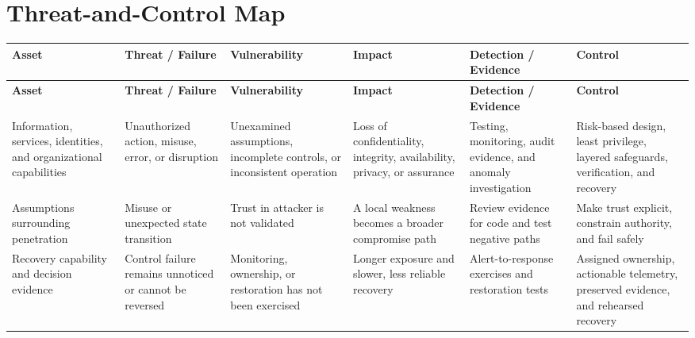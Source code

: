 \documentclass[11pt,letterpaper]{article}
\begin{document}
\section*{Threat-and-Control Map}
\begingroup\scriptsize\setlength{\tabcolsep}{2pt}
\begin{longtable}{>{\raggedright\arraybackslash}p{}>{\raggedright\arraybackslash}p{}>{\raggedright\arraybackslash}p{}>{\raggedright\arraybackslash}p{}>{\raggedright\arraybackslash}p{}>{\raggedright\arraybackslash}p{}}
\toprule\rowcolor{Navy}\color{white}\textbf{Asset} & \color{white}\textbf{Threat / Failure} & \color{white}\textbf{Vulnerability} & \color{white}\textbf{Impact} & \color{white}\textbf{Detection / Evidence} & \color{white}\textbf{Control}\\\midrule
\endfirsthead
\toprule\rowcolor{Navy}\color{white}\textbf{Asset} & \color{white}\textbf{Threat / Failure} & \color{white}\textbf{Vulnerability} & \color{white}\textbf{Impact} & \color{white}\textbf{Detection / Evidence} & \color{white}\textbf{Control}\\\midrule
\endhead
Information, services, identities, and organizational capabilities & Unauthorized action, misuse, error, or disruption & Unexamined assumptions, incomplete controls, or inconsistent operation & Loss of confidentiality, integrity, availability, privacy, or assurance & Testing, monitoring, audit evidence, and anomaly investigation & Risk-based design, least privilege, layered safeguards, verification, and recovery\\\midrule
Assumptions surrounding penetration & Misuse or unexpected state transition & Trust in attacker is not validated & A local weakness becomes a broader compromise path & Review evidence for code and test negative paths & Make trust explicit, constrain authority, and fail safely\\\midrule
Recovery capability and decision evidence & Control failure remains unnoticed or cannot be reversed & Monitoring, ownership, or restoration has not been exercised & Longer exposure and slower, less reliable recovery & Alert-to-response exercises and restoration tests & Assigned ownership, actionable telemetry, preserved evidence, and rehearsed recovery\\\midrule
\bottomrule
\end{longtable}
\endgroup
\end{document}
